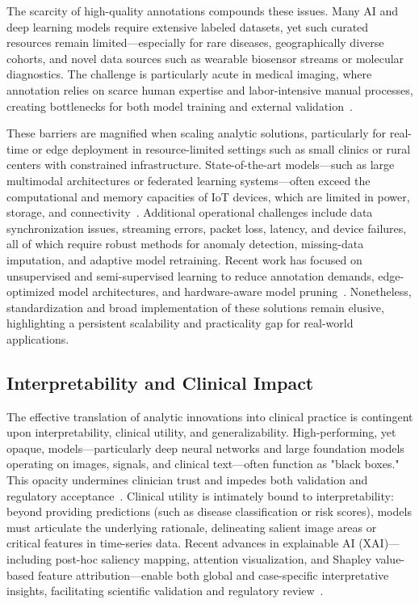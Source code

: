 \documentclass[sigconf]{acmart}
\begin{document}
The scarcity of high-quality annotations compounds these issues. Many AI and deep learning models require extensive labeled datasets, yet such curated resources remain limited—especially for rare diseases, geographically diverse cohorts, and novel data sources such as wearable biosensor streams or molecular diagnostics. The challenge is particularly acute in medical imaging, where annotation relies on scarce human expertise and labor-intensive manual processes, creating bottlenecks for both model training and external validation~\cite{ref54,ref53,ref55,ref65,ref66}.

These barriers are magnified when scaling analytic solutions, particularly for real-time or edge deployment in resource-limited settings such as small clinics or rural centers with constrained infrastructure. State-of-the-art models—such as large multimodal architectures or federated learning systems—often exceed the computational and memory capacities of IoT devices, which are limited in power, storage, and connectivity~\cite{ref16,ref37,ref46,ref54,ref57,ref61,ref70,ref71,ref72,ref73,ref74,ref75,ref76,ref78,ref83,ref90,ref106}. Additional operational challenges include data synchronization issues, streaming errors, packet loss, latency, and device failures, all of which require robust methods for anomaly detection, missing-data imputation, and adaptive model retraining. Recent work has focused on unsupervised and semi-supervised learning to reduce annotation demands, edge-optimized model architectures, and hardware-aware model pruning~\cite{ref28,ref51,ref54,ref56,ref61,ref66,ref72,ref78,ref102}. Nonetheless, standardization and broad implementation of these solutions remain elusive, highlighting a persistent scalability and practicality gap for real-world applications.

\subsection{Interpretability and Clinical Impact}

The effective translation of analytic innovations into clinical practice is contingent upon interpretability, clinical utility, and generalizability. High-performing, yet opaque, models—particularly deep neural networks and large foundation models operating on images, signals, and clinical text—often function as "black boxes." This opacity undermines clinician trust and impedes both validation and regulatory acceptance~\cite{ref11, ref32, ref36, ref39, ref46, ref50, ref53, ref54, ref65, ref68, ref70, ref72, ref73, ref78, ref80, ref87, ref90, ref98, ref99, ref106}. Clinical utility is intimately bound to interpretability: beyond providing predictions (such as disease classification or risk scores), models must articulate the underlying rationale, delineating salient image areas or critical features in time-series data. Recent advances in explainable AI (XAI)—including post-hoc saliency mapping, attention visualization, and Shapley value-based feature attribution—enable both global and case-specific interpretative insights, facilitating scientific validation and regulatory review~\cite{ref11, ref36, ref54, ref72, ref78, ref80, ref98, ref99}.
\end{document}
